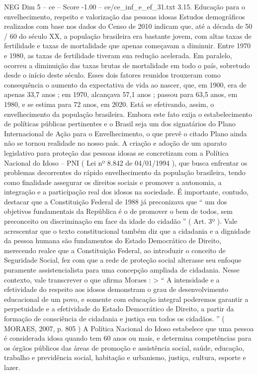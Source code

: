 \begin{textsample}{NEG Dim 5 – ce – Score -1.00 – ce/ce\_inf\_e\_ef\_31.txt}  \label{ex:f5_neg_038}
3.15.
Educação para o envelhecimento, respeito e valorização das pessoas idosas Estudos demográficos realizados com base nos dados do Censo de 2010 indicam que, até a década de 50 / 60 do século XX, a população brasileira era bastante jovem, com altas taxas de fertilidade e taxas de mortalidade que apenas começavam a diminuir.
Entre 1970 e 1980, as taxas de fertilidade tiveram sua redução acelerada.
Em paralelo, ocorreu a diminuição das taxas brutas de mortalidade em todo o país, sobretudo desde o início deste século.
Esses dois fatores reunidos trouxeram como consequência o aumento da expectativa de vida ao nascer, que, em 1900, era de apenas 33,7 anos ; em 1970, alcançava 57,1 anos ; passou para 63,5 anos, em 1980, e se estima para 72 anos, em 2020.
Está se efetivando, assim, o envelhecimento da população brasileira.
Embora este fato exija o estabelecimento de políticas públicas pertinentes e o Brasil seja um dos signatários do Plano Internacional de Ação para o Envelhecimento, o que prevê o citado Plano ainda não se tornou realidade no nosso país.
A criação e adoção de um aparato legislativo para proteção das pessoas idosas se concretizam com a Política Nacional do Idoso – PNI ( Lei nº 8.842 de 04/01/1994 ), que busca enfrentar os problemas decorrentes do rápido envelhecimento da população brasileira, tendo como finalidade assegurar os direitos sociais e promover a autonomia, a integração e a participação real dos idosos na sociedade.
É importante, contudo, destacar que a Constituição Federal de 1988 já preconizava que “ um dos objetivos fundamentais da República é o de promover o bem de todos, sem preconceito ou discriminação em face da idade do cidadão ” ( Art. 3º ).
Vale acrescentar que o texto constitucional também diz que a cidadania e a dignidade da pessoa humana são fundamentos do Estado Democrático de Direito, merecendo realce que a Constituição Federal, ao introduzir o conceito de Seguridade Social, fez com que a rede de proteção social alterasse seu enfoque puramente assistencialista para uma concepção ampliada de cidadania.
Nesse contexto, vale transcrever o que afirma Moraes : > “ A intensidade e a efetividade do respeito aos idosos demonstram o grau de desenvolvimento educacional de um povo, e somente com educação integral poderemos garantir a perpetuidade e a efetividade do Estado Democrático de Direito, a partir da formação de consciência de cidadania e justiça em todos os cidadãos. ” ( MORAES, 2007, p. 805 ) A Política Nacional do Idoso estabelece que uma pessoa é considerada idosa quando tem 60 anos ou mais, e determina competências para os órgãos públicos das áreas de promoção e assistência social, saúde, educação, trabalho e previdência social, habitação e urbanismo, justiça, cultura, esporte e lazer.

\end{textsample}
